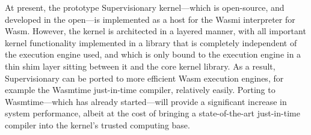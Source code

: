 \documentclass[a4paper, UKenglish, cleveref, autoref, thm-restate, colorlinks]{lipics-v2021}
\begin{document}
At present, the prototype Supervisionary kernel---which is open-source, and developed in the open---is implemented as a host for the Wasmi interpreter for Wasm.
However, the kernel is architected in a layered manner, with all important kernel functionality implemented in a library that is completely independent of the execution engine used, and which is only bound to the execution engine in a thin shim layer sitting between it and the core kernel library.
As a result, Supervisionary can be ported to more efficient Wasm execution engines, for example the Wasmtime just-in-time compiler, relatively easily.
Porting to Wasmtime---which has already started---will provide a significant increase in system performance, albeit at the cost of bringing a state-of-the-art just-in-time compiler into the kernel's trusted computing base.


\end{document}
